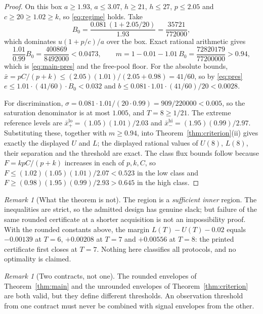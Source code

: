 \documentclass[11pt]{article}
\theoremstyle{definition}
\theoremstyle{remark}
\newtheorem{remark}[theorem]{Remark}
\newcommand{\xb}{\bar{x}}
\begin{document}
\begin{proof}
On this box $a\ge1.93$, $a\le3.07$, $h\ge21$, $h\le27$, $p\le2.05$ and
$c\ge20\ge1.02\ge k$, so \eqref{eq:regime} holds. Take
\[
B_0=\frac{0.081\,(1+2.05/20)}{1.93}=\frac{35721}{772000},
\]
which dominates $u(1+p/c)/a$ over the box. Exact rational arithmetic gives
\[
\frac{1.01}{0.99}B_0=\frac{400869}{8492000}<0.0473,
\qquad
m=1-0.01-1.01\,B_0=\frac{72820179}{77200000}>0.94,
\]
which is \eqref{eq:main-pres} and the free-pool floor. For the absolute bounds,
$\xb=pC/(p+k)\le(2.05)(1.01)/(2.05+0.98)=41/60$, so by \eqref{eq:pres}
$e\le1.01\cdot(41/60)\cdot B_0<0.032$ and
$b\le0.081\cdot1.01\cdot(41/60)/20<0.0028$.

For discrimination, $\sigma=0.081\cdot1.01/(20\cdot0.99)=909/220000<0.005$, so
the saturation denominator is at most $1.005$, and $T=8\ge1/21$. The extreme
reference levels are $\xb^{\mathrm{lo}}_+=(1.05)(1.01)/2.03$ and
$\xb^{\mathrm{hi}}_-=(1.95)(0.99)/2.97$. Substituting these, together with
$m\ge0.94$, into Theorem~\ref{thm:criterion}(ii) gives exactly the displayed
$U$ and $L$; the displayed rational values of $U(8)$, $L(8)$, their separation
and the threshold are exact. The class flux bounds follow because
$F=kpC/(p+k)$ increases in each of $p,k,C$, so
$F\le(1.02)(1.05)(1.01)/2.07<0.523$ in the low class and
$F\ge(0.98)(1.95)(0.99)/2.93>0.645$ in the high class.
\end{proof}

\begin{remark}[What the theorem is not]
The region is a \emph{sufficient inner} region. The inequalities are strict, so
the admitted design has genuine slack; but failure of the same rounded
certificate at a shorter acquisition is not an impossibility proof. With the
rounded constants above, the margin $L(T)-U(T)-0.02$ equals $-0.00139$ at
$T=6$, $+0.00208$ at $T=7$ and $+0.00556$ at $T=8$: the printed certificate
first closes at $T=7$. Nothing here classifies all protocols, and no optimality
is claimed.
\end{remark}

\begin{remark}[Two contracts, not one]
The rounded envelopes of Theorem~\ref{thm:main} and the unrounded envelopes of
Theorem~\ref{thm:criterion} are both valid, but they define different thresholds.
An observation threshold from one contract must never be combined with signal
envelopes from the other.
\end{remark}

\end{document}
